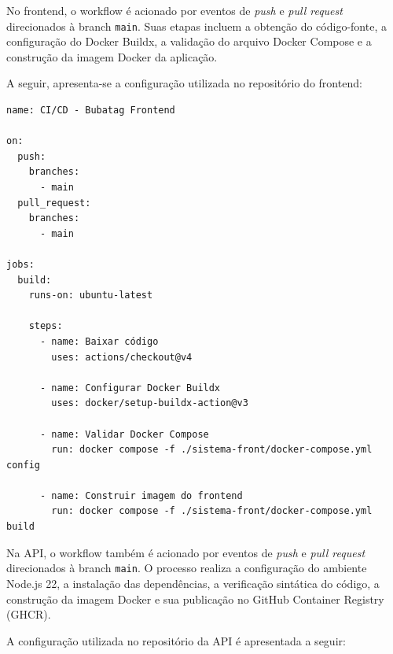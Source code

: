 \documentclass[11pt,a4paper]{article}
\begin{document}
No frontend, o workflow é acionado por eventos de \textit{push} e \textit{pull request} direcionados à branch \texttt{main}. Suas etapas incluem a obtenção do código-fonte, a configuração do Docker Buildx, a validação do arquivo Docker Compose e a construção da imagem Docker da aplicação.

A seguir, apresenta-se a configuração utilizada no repositório do frontend:

\begin{verbatim}
name: CI/CD - Bubatag Frontend

on:
  push:
    branches:
      - main
  pull_request:
    branches:
      - main

jobs:
  build:
    runs-on: ubuntu-latest

    steps:
      - name: Baixar código
        uses: actions/checkout@v4

      - name: Configurar Docker Buildx
        uses: docker/setup-buildx-action@v3

      - name: Validar Docker Compose
        run: docker compose -f ./sistema-front/docker-compose.yml config

      - name: Construir imagem do frontend
        run: docker compose -f ./sistema-front/docker-compose.yml build
\end{verbatim}

Na API, o workflow também é acionado por eventos de \textit{push} e \textit{pull request} direcionados à branch \texttt{main}. O processo realiza a configuração do ambiente Node.js 22, a instalação das dependências, a verificação sintática do código, a construção da imagem Docker e sua publicação no GitHub Container Registry (GHCR).

A configuração utilizada no repositório da API é apresentada a seguir:
\end{document}
